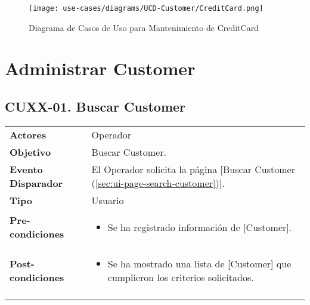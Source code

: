 	\begin{figure}[H]
		\begin{center}
		\label{tab:ucd-entity-creditcard}
		\texttt{[image: use-cases/diagrams/UCD-Customer/CreditCard.png]}
		\caption{Diagrama de Casos de Uso para Mantenimiento de CreditCard}
		\end{center}
	\end{figure}
	\clearpage
	\section{Administrar Customer} \label{sec:cf-uc-admin-customer}
	
	\subsection{CUXX-01. Buscar Customer} \label{sec:cu-search-Customer}
	
	\begin{tabular}{ p{3.5cm} p{11.5cm} }
		\textbf{Actores} & Operador\\
		\textbf{Objetivo} & Buscar Customer.\\
		\textbf{Evento Disparador} & El Operador solicita la p\'agina [Buscar Customer (\ref{sec:ui-page-search-customer})].\\
		\textbf{Tipo} & Usuario\\
		\textbf{Pre-condiciones} &
			\begin{minipage}[t]{0.6\textwidth}
			\begin{itemize}[noitemsep,nolistsep]
			\setlength{\itemindent}{-.5cm}
				\item Se ha registrado informaci\'on de [Customer].
			\end{itemize}
			\end{minipage} \\
		\textbf{Post-condiciones} &
			\begin{minipage}[t]{0.6\textwidth}
			\begin{itemize}[noitemsep,nolistsep]
			\setlength{\itemindent}{-.5cm}
				\item Se ha mostrado una lista de [Customer] que cumplieron los criterios solicitados.
			\end{itemize}
			\end{minipage} \\
		\\
	\end{tabular}
	
